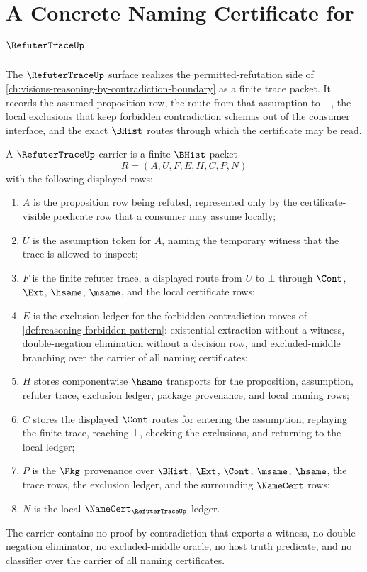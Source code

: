 \chapter{A Concrete Naming Certificate for $\RefuterTraceUp$}
\label{ch:concrete-instances-refutertrace-namecert}

The $\RefuterTraceUp$ surface realizes the permitted-refutation side of \autoref{ch:visions-reasoning-by-contradiction-boundary} as a finite trace packet. It records the assumed proposition row, the route from that assumption to $\bot$, the local exclusions that keep forbidden contradiction schemas out of the consumer interface, and the exact $\BHist$ routes through which the certificate may be read.

\begin{definition}
\label{def:refuter-trace-carrier}
A $\RefuterTraceUp$ carrier is a finite $\BHist$ packet
$$
R=(A,U,F,E,H,C,P,N)
$$
with the following displayed rows:
\begin{enumerate}
\item $A$ is the proposition row being refuted, represented only by the certificate-visible predicate row that a consumer may assume locally;
\item $U$ is the assumption token for $A$, naming the temporary witness that the trace is allowed to inspect;
\item $F$ is the finite refuter trace, a displayed route from $U$ to $\bot$ through $\Cont$, $\Ext$, $\hsame$, $\msame$, and the local certificate rows;
\item $E$ is the exclusion ledger for the forbidden contradiction moves of \autoref{def:reasoning-forbidden-pattern}: existential extraction without a witness, double-negation elimination without a decision row, and excluded-middle branching over the carrier of all naming certificates;
\item $H$ stores componentwise $\hsame$ transports for the proposition, assumption, refuter trace, exclusion ledger, package provenance, and local naming rows;
\item $C$ stores the displayed $\Cont$ routes for entering the assumption, replaying the finite trace, reaching $\bot$, checking the exclusions, and returning to the local ledger;
\item $P$ is the $\Pkg$ provenance over $\BHist$, $\Ext$, $\Cont$, $\msame$, $\hsame$, the trace rows, the exclusion ledger, and the surrounding $\NameCert$ rows;
\item $N$ is the local $\NameCert_{\RefuterTraceUp}$ ledger.
\end{enumerate}
The carrier contains no proof by contradiction that exports a witness, no double-negation eliminator, no excluded-middle oracle, no host truth predicate, and no classifier over the carrier of all naming certificates.
\end{definition}


